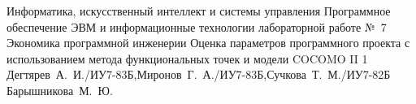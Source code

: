 \documentclass{bmstu}
\begin{document}
\makereporttitle
    {Информатика, искусственный интеллект и системы управления}
    {Программное обеспечение ЭВМ и информационные технологии}
    {лабораторной работе №~7}
    {Экономика программной инженерии}
    {Оценка параметров программного проекта с использованием метода
функциональных точек и модели COCOMO II}
    {1}
    {Дегтярев~А.~И./ИУ7-83Б,Миронов~Г.~А./ИУ7-83Б,Сучкова~Т.~М./ИУ7-82Б}
    {Барышникова~М.~Ю.}








\end{document}
